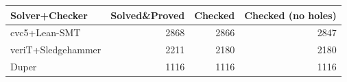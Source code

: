 \begin{tabular}{lrrr}
    \toprule
    Solver+Checker     & Solved\&Proved & Checked & Checked (no holes) \\
    \midrule
    cvc5+Lean-SMT      & 2868           & 2866    & 2847               \\
    veriT+Sledgehammer & 2211           & 2180    & 2180               \\
    Duper              & 1116           & 1116    & 1116               \\
    \bottomrule
\end{tabular}
